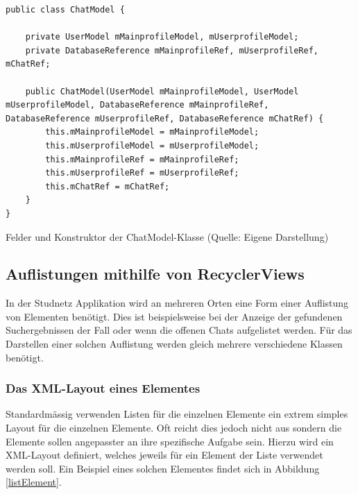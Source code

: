 \documentclass[../main.tex]{subfiles}
\begin{document}
\begin{code}
	\begin{center}
		\begin{verbatim}
public class ChatModel {

	private UserModel mMainprofileModel, mUserprofileModel;
	private DatabaseReference mMainprofileRef, mUserprofileRef, mChatRef;

	public ChatModel(UserModel mMainprofileModel, UserModel mUserprofileModel, DatabaseReference mMainprofileRef, DatabaseReference mUserprofileRef, DatabaseReference mChatRef) {
		this.mMainprofileModel = mMainprofileModel;
		this.mUserprofileModel = mUserprofileModel;
		this.mMainprofileRef = mMainprofileRef;
		this.mUserprofileRef = mUserprofileRef;
		this.mChatRef = mChatRef;
	}
}

		\end{verbatim}
		\caption{Felder und Konstruktor der ChatModel-Klasse (Quelle: Eigene Darstellung)}
		\label{chatModelConst}
	\end{center}
	
\end{code}
		
	\subsection{Auflistungen mithilfe von RecyclerViews}
	In der Studnetz Applikation wird an mehreren Orten eine Form einer Auflistung von Elementen benötigt. Dies ist beispielsweise bei der Anzeige der gefundenen Suchergebnissen der Fall oder wenn die offenen Chats aufgelistet werden. Für das Darstellen einer solchen Auflistung werden gleich mehrere verschiedene Klassen benötigt.
	
	\subsubsection{Das XML-Layout eines Elementes}
	Standardmässig verwenden Listen für die einzelnen Elemente ein extrem simples Layout für die einzelnen Elemente. Oft reicht dies jedoch nicht aus sondern die Elemente sollen angepasster an ihre spezifische Aufgabe sein. Hierzu wird ein XML-Layout definiert, welches jeweils für ein Element der Liste verwendet werden soll. Ein Beispiel eines solchen Elementes findet sich in Abbildung \ref{listElement}.
	
\end{document}
